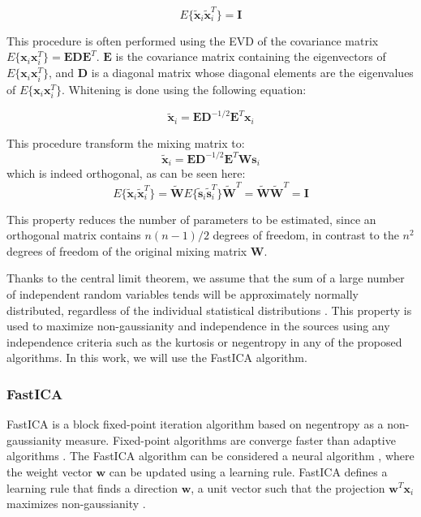 \begin{equation}
E\{\tilde{\mathbf{x}}_i \tilde{\mathbf{x}}_i^T\}=\mathbf{I}
\end{equation}

This procedure is often performed using the \acf{EVD} of the covariance matrix $E\{\mathbf{x}_i \mathbf{x}_i^T\} = \mathbf{E}\mathbf{D}\mathbf{E}^T$. $\mathbf{E}$ is the covariance matrix containing the eigenvectors of $E\{\mathbf{x}_i \mathbf{x}_i^T\}$, and $\mathbf{D}$ is a diagonal matrix whose diagonal elements are the eigenvalues of $E\{\mathbf{x}_i \mathbf{x}_i^T\}$. Whitening is done using the following equation: 

\begin{equation}
\tilde{\mathbf{x}}_i= \mathbf{E}\mathbf{D}^{-1/2}\mathbf{E}^T\mathbf{x}_i
\end{equation}

This procedure transform the mixing matrix to:
\begin{equation}
\tilde{\mathbf{x}}_i = \mathbf{E}\mathbf{D}^{-1/2}\mathbf{E}^T \mathbf{W}\mathbf{s}_i
\end{equation}
which is indeed orthogonal, as can be seen here:
\begin{equation}
 E\{\tilde{\mathbf{x}}_i\tilde{\mathbf{x}}_i^T\} = \tilde{\mathbf{W}} E\{\tilde{\mathbf{s}}_i\tilde{\mathbf{s}}_i^T\}\tilde{\mathbf{W}}^T 	=\tilde{\mathbf{W}}\tilde{\mathbf{W}}^T=\mathbf{I}
\end{equation}
 
This property reduces the number of parameters to be estimated, since an orthogonal matrix contains $n(n-1)/2$ degrees of freedom, in contrast to the $n^2$ degrees of freedom of the original mixing matrix $\mathbf{W}$. 

Thanks to the central limit theorem, we assume that the sum of a large number of independent random variables tends will be approximately normally distributed, regardless of the individual statistical distributions \cite{Rice2006}. This property is used to maximize non-gaussianity and independence in the sources using any independence criteria such as the kurtosis or negentropy in any of the proposed algorithms. In this work, we will use the FastICA algorithm. 

\subsubsection{FastICA}
FastICA is a block fixed-point iteration algorithm \cite{Oja1997,FastICA99} based on negentropy as a non-gaussianity measure. Fixed-point algorithms are converge faster than adaptive algorithms \cite{FastICA99}. The FastICA algorithm can be considered a neural algorithm \cite{Hyvarinen2000}, where the weight vector $\mathbf{w}$ can be updated using a learning rule. FastICA defines a learning rule that finds a direction $\mathbf{w}$, a unit vector such that the projection $\mathbf{w}^T\mathbf{x}_i$ maximizes non-gaussianity \cite{FastICA99}. 

